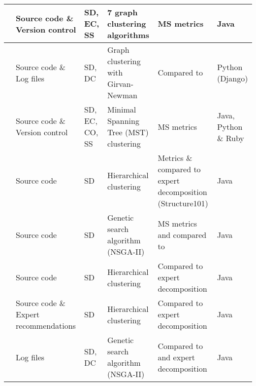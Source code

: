 \begin{table}[ht]
\begin{tabular}{>{\centering}m{7pt} >{\raggedright}m{55pt} >{\raggedright}m{30pt} >{\raggedright}m{80pt} >{\raggedright}m{80pt} >{\raggedright\arraybackslash}m{40pt}}
        \midrule
        \cite{lohnertz2020steinmetz}
        & Source code \& Version control
        & SD, EC, SS
        & 7 graph clustering algorithms
        & MS metrics
        & Java \\
        \midrule
        \cite{matias2020determining}
        & Source code \& Log files
        & SD, DC
        & Graph clustering with Girvan-Newman 
        & Compared to \cite{gysel2016service}
        & Python (Django) \\
        \midrule
        \cite{mazlami2017extraction}
        & Source code \& Version control
        & SD, EC, CO, SS
        & Minimal Spanning Tree (MST) clustering 
        & MS metrics
        & Java, Python \& Ruby \\
        \midrule
        \cite{nunes2019monolith}
        & Source code
        & SD
        & Hierarchical clustering
        & Metrics \& compared to expert decomposition (Structure101) 
        & Java \\
        \midrule
        \cite{saidani2019towards}
        & Source code
        & SD
        & Genetic search algorithm (NSGA-II) \cite{deb2002fast}
        & MS metrics and compared to \cite{jin2018functionality} \cite{mazlami2017extraction} \cite{andritsos2005information}
        & Java \\
        \midrule
        \cite{selmadji2018re}
        & Source code
        & SD
        & Hierarchical clustering
        & Compared to expert decomposition
        & Java \\
        \midrule
        \cite{selmadji2020monolithic}
        & Source code \& Expert recommendations
        & SD
        & Hierarchical clustering \cite{johnson1967hierarchical}
        & Compared to expert decomposition
        & Java \\
        \midrule
        \cite{zhang2020automated}
        & Log files
        & SD, DC
        & Genetic search algorithm (NSGA-II) \cite{deb2002fast}
        & Compared to \cite{jin2018functionality} and expert decomposition
        & Java \\
        \bottomrule
    \end{tabular}
\end{table}

